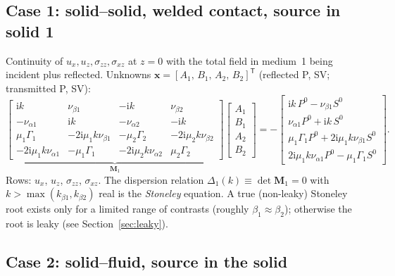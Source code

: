 \documentclass[11pt,a4paper]{article}
\newcommand{\ii}{\mathrm{i}}
\begin{document}
\subsection{Case 1: solid--solid, welded contact, source in solid 1}

Continuity of $u_x,u_z,\sigma_{zz},\sigma_{xz}$ at $z=0$ with the total field in medium~1 being
incident plus reflected. Unknowns $\mathbf x=[A_1,\,B_1,\,A_2,\,B_2]^{\mathsf T}$ (reflected P, SV;
transmitted P, SV):
\begin{equation}
\underbrace{\begin{bmatrix}
 \ii k & \nu_{\beta1} & -\ii k & \nu_{\beta2}\\[2pt]
 -\nu_{\alpha1} & \ii k & -\nu_{\alpha2} & -\ii k\\[2pt]
 \mu_1\Gamma_1 & -2\ii\mu_1k\nu_{\beta1} & -\mu_2\Gamma_2 & -2\ii\mu_2k\nu_{\beta2}\\[2pt]
 -2\ii\mu_1k\nu_{\alpha1} & -\mu_1\Gamma_1 & -2\ii\mu_2k\nu_{\alpha2} & \mu_2\Gamma_2
\end{bmatrix}}_{\mathbf M_1}
\begin{bmatrix}A_1\\ B_1\\ A_2\\ B_2\end{bmatrix}
=
-\begin{bmatrix}
 \ii k\,P^0-\nu_{\beta1}S^0\\
 \nu_{\alpha1}P^0+\ii k\,S^0\\
 \mu_1\Gamma_1P^0+2\ii\mu_1k\nu_{\beta1}S^0\\
 2\ii\mu_1k\nu_{\alpha1}P^0-\mu_1\Gamma_1S^0
\end{bmatrix}.
\label{eq:case1}
\end{equation}
Rows: $u_x$, $u_z$, $\sigma_{zz}$, $\sigma_{xz}$. The dispersion relation
$\Delta_1(k)\equiv\det\mathbf M_1=0$ with $k>\max(k_{\beta1},k_{\beta2})$ real is the
\emph{Stoneley} equation. A true (non-leaky) Stoneley root exists only for a limited range of
contrasts (roughly $\beta_1\approx\beta_2$); otherwise the root is leaky (see
Section~\ref{sec:leaky}).

\subsection{Case 2: solid--fluid, source in the solid}
\end{document}
